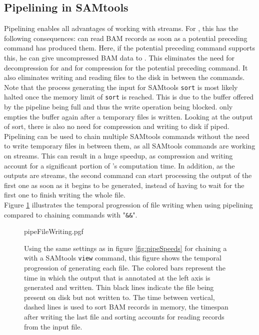 \subsection{Pipelining in SAMtools}
Pipelining enables all advantages of working with streams. For \sort, this has the following consequences: \sort can read BAM records as soon as a potential preceding command has produced them. Here, if the potential preceding command supports this, he can give uncompressed BAM data to \sort. This eliminates the need for decompression for \sort and for compression for the potential preceding command. It also eliminates writing and reading files to the disk in between the commands. Note that the process generating the input for SAMtools \texttt{sort} is most likely halted once the memory limit of \texttt{sort} is reached. This is due to the buffer offered by the pipeline being full and thus the write operation being blocked. \sort only empties the buffer again after a temporary files is written. Looking at the output of sort, there is also no need for compression and writing to disk if piped. \\
Pipelining can be used to chain multiple SAMtools commands without the need to write temporary files in between them, as all SAMtools commands are working on streams. This can result in a huge speedup, as compression and writing account for a significant portion of \sort's computation time. In addition, as the outputs are streams, the second command can start processing the output of the first one as soon as it begins to be generated, instead of having to wait for the first one to finish writing the whole file. \\
Figure \ref{fig:pipeWrite} illustrates the temporal progression of file writing when using pipelining compared to chaining commands with "\texttt{\&\&}".
\begin{figure}[t]
        {pipeFileWriting.pgf}
    \caption{Using the same settings as in figure \ref{fig:pipeSpeeds} for chaining a \sort with a SAMtools \texttt{view} command, this figure shows the temporal progression of generating each file. The colored bars represent the time in which the output that is annotated at the left axis is generated and written. Thin black lines indicate the file being present on disk but not written to. The time between vertical, dashed lines is used to sort BAM records in memory, the timespan after writing the last file and sorting accounts for reading records from the input file. }
    \label{fig:pipeWrite}
\end{figure}
